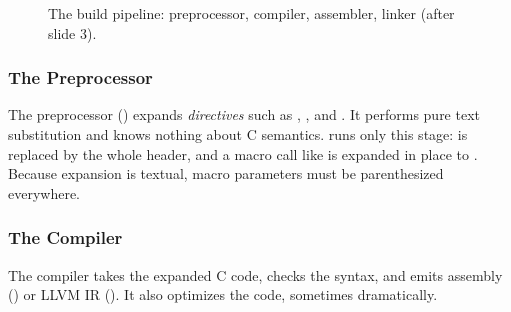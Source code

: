 \begin{figure}[htbp]
\centering
{}
\caption{The build pipeline: preprocessor, compiler, assembler, linker (after slide 3).}
\label{fig:pipeline}
\end{figure}

\subsubsection{The Preprocessor}

The preprocessor () expands \emph{directives} such as , , and . It performs pure text substitution and knows nothing about C semantics.  runs only this stage:  is replaced by the whole header, and a macro call like  is expanded in place to . Because expansion is textual, macro parameters must be parenthesized everywhere.

\subsubsection{The Compiler}

The compiler takes the expanded C code, checks the syntax, and emits assembly () or LLVM IR (). It also optimizes the code, sometimes dramatically.

